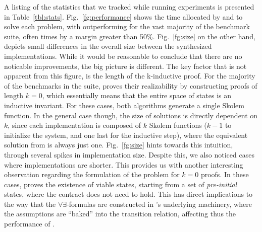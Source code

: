 A listing of the statistics that we tracked while running experiments is
presented in Table~\ref{tbl:stats}.
Fig.~\ref{fg:performance} shows the time allocated by \jsyn and \jsynvg to solve each problem, with \jsynvg
outperforming \jsyn for the vast majority of the benchmark suite, often times by a margin greater than
50\%. Fig.~\ref{fg:size} on the other hand, depicts small differences in the
overall size between the synthesized implementations. While it would be
reasonable to conclude that there are no noticable improvements, the big picture is different. The key factor that is not apparent from this figure, is the length of the k-inductive proof. For the majority of the benchmarks in the suite, \jsyn proves their realizability by constructing proofs of length $k=0$, which essentially means that the entire space of states is an inductive invariant. For these cases, both algorithms generate a single Skolem function. In the general case though, the size of \jsyn solutions is directly
dependent on $k$, since each implementation is composed of $k$ Skolem
functions ($k-1$ to initialize the system, and one last for the inductive step),
where the equivalent solution from \jsynvg is always just one.
Fig.~\ref{fg:size} hints towards this intuition, through several spikes
in \jsyn implementation size. Despite this, we also noticed cases where \jsyn
implementations are shorter. This provides us with another interesting
observation regarding the formulation of the problem for $k=0$ proofs. In
these cases, \jsyn proves the existence of viable states, starting from a set
of \textit{pre-initial} states, where the contract does not need to hold. This
has direct implications to the way that the $\forall\exists$-formulas are
constructed in \jsyn's underlying machinery, where the assumptions are ``baked''
into the transition relation, affecting thus the performance of \aeval.

